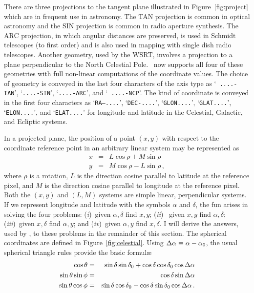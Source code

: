 There are three projections to the tangent plane illustrated in
Figure~\ref{fig:project} which are in frequent use in astronomy.  The
TAN projection is common in optical astronomy and the SIN projection
is common in radio aperture synthesis.  The ARC projection, in which
angular distances are preserved, is used in Schmidt telescopes (to
first order) and is also used in mapping with single dish radio
telescopes.  Another geometry, used by the WSRT, involves a projection
to a plane perpendicular to the North Celestial Pole.  \AIPS\ now
supports all four of these geometries with full non-linear
computations of the coordinate values.  The choice of geometry is
conveyed in the last four characters of the axis type as `{\tt
....-TAN}', `{\tt ....-SIN}', `{\tt ....-ARC}', and \hbox{`{\tt
....-NCP}'}. The kind of coordinate is conveyed in the first four
characters as `{\tt RA--....}', `{\tt DEC-....}', `{\tt GLON....}',
`{\tt GLAT....}',  `{\tt ELON....}', and `{\tt ELAT....}' for
longitude and latitude in the Celestial, Galactic, and Ecliptic
systems.

In a projected plane, the position of a point $(x,y)$ with respect to
the coordinate reference point in an arbitrary linear system may be
represented as
\begin{equation}
\begin{array}{lcl}
  x & = &L\cos\rho+M\sin\rho \\
  y & = &M\cos\rho-L\sin\rho \, ,
\end{array}
\label{eq:xy=LM}
\end{equation}
where $\rho$ is a rotation, $L$ is the direction cosine parallel to
latitude at the reference pixel, and $M$ is the direction cosine
parallel to longitude at the reference pixel.  Both the $(x,y)$ and
$(L,M)$ systems are simple linear, perpendicular systems. If we
represent longitude and latitude with the symbols $\alpha$ and
$\delta$, the fun arises in solving the four problems: ({\it i}\/)\
given $\alpha,\delta$ find $x,y$; ({\it ii}\/) \ given $x,y$ find
$\alpha,\delta$; ({\it iii}\/)\ given $x,\delta$ find $\alpha,y$; and
({\it iv}\/)\ given $\alpha,y$ find $x,\delta$. I will derive the
answers, used by \AIPS, to these problems in the remainder of this
section. The spherical coordinates are defined in
Figure~\ref{fig:celestial}. Using $\Delta\alpha \equiv \alpha -
\alpha_0$, the usual spherical triangle rules provide the basic
formul\ae
\begin{eqnarray}
 \cos\theta & = &\sin\delta\sin\delta_0+\cos\delta \cos\delta_0
                 \cos\Delta \alpha  \label{eq:cost}\\
 \sin\theta \sin\phi & = &\cos\delta \sin\Delta\alpha  \label{eq:ssinp}\\
 \sin\theta \cos\phi & = &\sin\delta \cos\delta_0-\cos\delta \sin\delta_0
                         \cos\Delta\alpha \, .  \label{eq:scosp}
\end{eqnarray}

